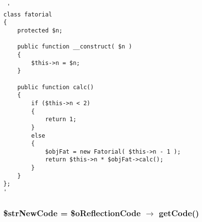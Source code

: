 \begin{Code}\begin{verbatim} '
class fatorial
{
    protected $n;

    public function __construct( $n )
    {
        $this->n = $n;
    }

    public function calc()
    {
        if ($this->n < 2)
        {
            return 1;
        }
        else
        {
            $objFat = new Fatorial( $this->n - 1 );
            return $this->n * $objFat->calc();
        }
    }
};
'
\end{verbatim}
\end{Code}
\hypertarget{code_instrumentation_2example_2test1_8php_882f0b62de6f379d0e0cf88ef6658601}{
\subsubsection[{\$strNewCode}]{\setlength{\rightskip}{0pt plus 5cm}\$strNewCode = \$oReflectionCode $\rightarrow$ getCode()}}
\label{code_instrumentation_2example_2test1_8php_882f0b62de6f379d0e0cf88ef6658601}



